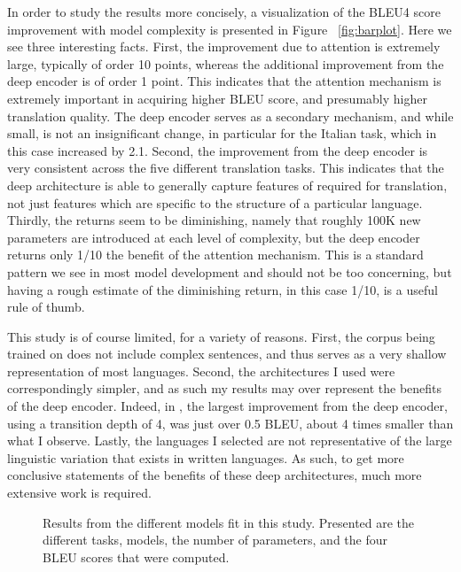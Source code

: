 \documentclass[twocolumn,superscriptaddress]{revtex4-1}
\begin{document}
In order to study the results more concisely, a visualization of the BLEU4 score improvement with model complexity is presented in Figure ~\ref{fig:barplot}.
Here we see three interesting facts.
First, the improvement due to attention is extremely large, typically of order 10 points, whereas the additional improvement from the deep encoder is of order 1 point.
This indicates that the attention mechanism is extremely important in acquiring higher BLEU score, and presumably higher translation quality.
The deep encoder serves as a secondary mechanism, and while small, is not an insignificant change, in particular for the Italian task, which in this case increased by 2.1.
Second, the improvement from the deep encoder is very consistent across the five different translation tasks.
This indicates that the deep architecture is able to generally capture features of required for translation, not just features which are specific to the structure of a particular language.
Thirdly, the returns seem to be diminishing, namely that roughly 100K new parameters are introduced at each level of complexity, but the deep encoder returns only 1/10 the benefit of the attention mechanism.
This is a standard pattern we see in most model development and should not be too concerning, but having a rough estimate of the diminishing return, in this case 1/10, is a useful rule of thumb.

This study is of course limited, for a variety of reasons.
First, the corpus being trained on does not include complex sentences, and thus serves as a very shallow representation of most languages.
Second, the architectures I used were correspondingly simpler, and as such my results may over represent the benefits of the deep encoder.
Indeed, in \cite{miceli-barone-etal-2017-deep}, the largest improvement from the deep encoder, using a transition depth of 4, was just over 0.5 BLEU, about 4 times smaller than what I observe.
Lastly, the languages I selected are not representative of the large linguistic variation that exists in written languages.
As such, to get more conclusive statements of the benefits of these deep architectures, much more extensive work is required.

\begin{figure}

\label{fig:table}
\caption{
Results from the different models fit in this study.
Presented are the different tasks, models, the number of parameters, and the four BLEU scores that were computed.
}
\end{figure}
\end{document}
